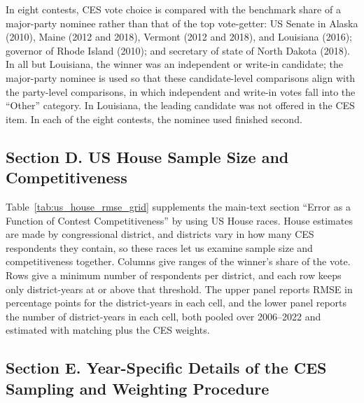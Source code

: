 \documentclass[12pt]{article}
\begin{document}
In eight contests, CES vote choice is compared with the benchmark share of a major-party nominee rather than that of the top vote-getter: US Senate in Alaska (2010), Maine (2012 and 2018), Vermont (2012 and 2018), and Louisiana (2016); governor of Rhode Island (2010); and secretary of state of North Dakota (2018). In all but Louisiana, the winner was an independent or write-in candidate; the major-party nominee is used so that these candidate-level comparisons align with the party-level comparisons, in which independent and write-in votes fall into the ``Other'' category. In Louisiana, the leading candidate was not offered in the CES item. In each of the eight contests, the nominee used finished second.


\subsection*{Section D. US House Sample Size and Competitiveness}
{}
\label{app:us_house_grid}

Table~\ref{tab:us_house_rmse_grid} supplements the main-text section ``Error as a Function of Contest Competitiveness'' by using US House races. House estimates are made by congressional district, and districts vary in how many CES respondents they contain, so these races let us examine sample size and competitiveness together. Columns give ranges of the winner's share of the vote. Rows give a minimum number of respondents per district, and each row keeps only district-years at or above that threshold. The upper panel reports RMSE in percentage points for the district-years in each cell, and the lower panel reports the number of district-years in each cell, both pooled over 2006--2022 and estimated with matching plus the CES weights.


\clearpage


\clearpage
\subsection*{Section E. Year-Specific Details of the CES Sampling and Weighting Procedure}
{}
\label{app:ces_procedure_by_year}
\end{document}
